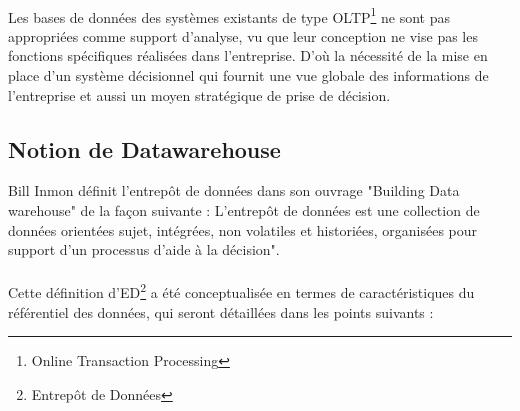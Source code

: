 \paragraph{}
Les bases de données des systèmes existants de type OLTP\footnote{Online Transaction Processing} ne sont pas appropriées comme support d’analyse, vu que leur conception ne vise pas les fonctions spécifiques réalisées dans l’entreprise. D’où la nécessité de la mise en place d’un système décisionnel qui fournit une vue globale des informations de l’entreprise et aussi un moyen stratégique de prise de décision.

\subsection{Notion de Datawarehouse}
Bill Inmon définit l’entrepôt de données dans son ouvrage "Building Data warehouse" de la façon suivante : L’entrepôt de données est une collection de données orientées sujet, intégrées, non volatiles et historiées, organisées pour support d’un processus d’aide à la décision".
\paragraph{}
Cette définition d’ED\footnote{Entrepôt de Données} a été conceptualisée en termes de caractéristiques du référentiel des données, qui seront détaillées dans les points suivants :

